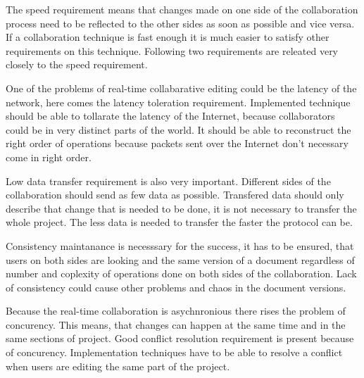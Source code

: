 \documentclass[12pt,oneside,draft]{fithesis2}
\begin{document}
\par The speed requirement means that changes made on one side of the collaboration process need to be reflected to the other sides as soon as possible and vice versa. If a collaboration technique is fast enough it is much easier to satisfy other requirements on this technique. Following two requirements are releated very closely to the speed requirement. \par One of the problems of real-time collabarative editing could be the latency of the network, here comes the latency toleration requirement. Implemented technique should be able to tollarate the latency of the Internet, because collaborators could be in very distinct parts of the world. It should be able to reconstruct the right order of operations because packets sent over the Internet don't necessary come in right order.\par Low data transfer requirement is also very important. Different sides of the collaboration should send as few data as possible. Transfered data should only describe that change that is needed to be done, it is not necessary to transfer the whole project. The less data is needed to transfer the faster the protocol can be.  \par Consistency maintanance is necesssary for the success, it has to be ensured, that users on both sides are looking and the same version of a document regardless of number and coplexity of operations done on both sides of the collaboration. Lack of consistency could cause other problems and chaos in the document versions. \par Because the real-time collaboration is asychnronious there rises the problem of concurency. This means, that changes can happen at the same time and in the same sections of project. Good conflict resolution requirement is present because of concurency. Implementation techniques have to be able to resolve a conflict when users are editing the same part of the project.
 
 
\end{document}
